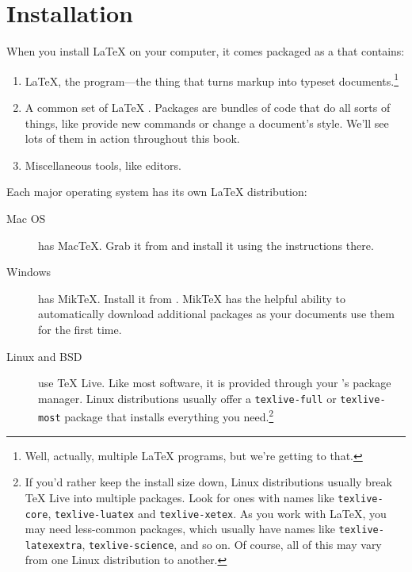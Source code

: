 \chapter{Installation}
\label{installation}

When you install \LaTeX{} on your computer, it comes packaged as a
 that contains:
\begin{enumerate}
\item \LaTeX, the program---the thing that turns markup into
    typeset documents.\footnote{Well, actually, multiple \LaTeX{} programs,
    but we're getting to that.}
\item A common set of \LaTeX{} .
    Packages are bundles of code that do all sorts of things,
    like provide new commands or change a document's style.
    We'll see lots of them in action throughout this book.
\item Miscellaneous tools, like editors.
\end{enumerate}
Each major operating system has its own \LaTeX{} distribution:
\begin{description}
\item[Mac OS] has Mac\TeX. Grab it from 
    and install it using the instructions there.

\item[Windows] has Mik\TeX.
    Install it from .
    Mik\TeX{} has the helpful ability to automatically download
    additional packages as your documents use them for the first time.

\item[Linux and BSD] use \TeX{} Live.
    Like most software, it is provided through your
    's package manager.
    Linux distributions usually offer a \texttt{texlive-\allowbreak full}
    or \texttt{texlive-\allowbreak most} package that installs everything
    you need.\punckern\footnote{%
    If you'd rather keep the install size down,
    Linux distributions usually break \TeX{} Live into multiple packages.
    Look for ones with names like
    \texttt{texlive-\allowbreak core}, \texttt{texlive-\allowbreak luatex}
    and \texttt{texlive-\allowbreak xetex}.
    As you work with \LaTeX, you may need less-common packages,
    which usually have names like \texttt{texlive-\allowbreak latexextra},
    \texttt{texlive-\allowbreak science}, and so on.
    Of course, all of this may vary from one Linux distribution to another.}
\end{description}

